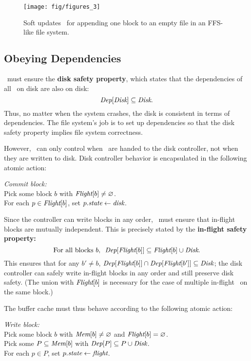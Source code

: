 \begin{figure}[t]
  \centering
  \texttt{[image: fig/figures\_3]}
  \caption{\label{fig:softupdate} Soft updates \patches\
  for appending one block to an empty file in an FFS-like file system.}
\end{figure}


\subsection{Obeying Dependencies}
\label{sec:patch:dependencies}

\Kudos\ must ensure the \textbf{disk safety property}, which states that
 the dependencies of all \patches\ on disk are also on disk:
%
\[ \PDepset{\PDisk} \subseteq \PDisk. \]
%
Thus, no matter when the system crashes, the disk is consistent in terms of
dependencies.
%
The file system's job is to set up dependencies so that the disk safety
property implies file system correctness.

However, \Kudos\ can only control when \patches\ are handed to the disk
 controller, not when they are written to disk.
%
Disk controller behavior is encapsulated in the following atomic action:

\begin{tabbing}
\textit{Commit block:} \\
\quad Pick some block $b$ with $\PInf[b] \neq \emptyset$. \\
\quad For each $p \in \PInf[b]$, set $p.\textit{state} \gets \textit{disk}$.
\end{tabbing}

\noindent
%
Since the controller can write blocks in any order, \Kudos\ must ensure
that in-flight blocks are mutually independent.  This is precisely stated
by the \textbf{in-flight safety property:}
%
\[ \text{For all blocks $b$,~~} \PDepset{\PInf[b]} \subseteq \PInf[b] \cup \PDisk . \]
%
This ensures that for any $b' \neq b$, $\PDepset{\PInf[b]} \cap
 \PDepset{\PInf[b']} \subseteq \PDisk$; the disk controller can safely
 write in-flight blocks in any order and still preserve disk safety.
%
(The union with $\PInf[b]$ is necessary for the case of multiple in-flight
\patches\ on the same block.)


The buffer cache must thus behave according to the following atomic action:

\begin{tabbing}
\textit{Write block:} \\
\quad Pick some block $b$ with $\PMem[b] \neq \emptyset$ and $\PInf[b] =
\emptyset$. \\
\quad Pick some $P \subseteq \PMem[b]$ with $\PDepset{P} \subseteq P \cup
\PDisk$. \\
\quad For each $p \in P$, set $p.\textit{state} \gets \textit{flight}$.
\end{tabbing}

